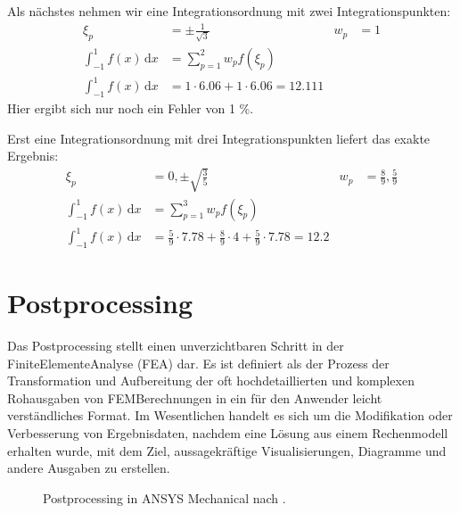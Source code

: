 \documentclass[letterpaper,10pt,german]{jupyterBook}
\let\sphinxpxdimen\pdfpxdimen\else\newdimen\sphinxpxdimen
\begin{document}
\sphinxAtStartPar
Als nächstes nehmen wir eine Integrationsordnung mit zwei Integrationspunkten:
\begin{align*}
\xi_p &= \pm \frac{1}{\sqrt{3}} & w_p &= 1 \\
\int_{-1}^{1} f(x) \, \mathrm{d}x &= \sum_{p=1}^{2} w_p f(\xi_p)  \\
\int_{-1}^{1} f(x) \, \mathrm{d}x &= 1 \cdot 6.06  + 1 \cdot 6.06 = 12.111
\end{align*}
\sphinxAtStartPar
Hier ergibt sich nur noch ein Fehler von 1 \%.

\sphinxAtStartPar
Erst eine Integrationsordnung mit drei Integrationspunkten liefert das exakte Ergebnis:
\begin{align*}
\xi_p &= 0, \pm \sqrt{\frac{3}{5}} & w_p &= \frac{8}{9}, \frac{5}{9} \\
\int_{-1}^{1} f(x) \, \mathrm{d}x &= \sum_{p=1}^{3} w_p f(\xi_p) \\
\int_{-1}^{1} f(x) \, \mathrm{d}x &= \frac{5}{9} \cdot 7.78  + \frac{8}{9} \cdot 4 + \frac{5}{9} \cdot 7.78  = 12.2
\end{align*}
\sphinxstepscope


\section{Postprocessing}
\label{\detokenize{chapters/chapter3/Postprocessing:postprocessing}}\label{\detokenize{chapters/chapter3/Postprocessing::doc}}
\sphinxAtStartPar
Das Postprocessing stellt einen unverzichtbaren Schritt in der Finite\sphinxhyphen{}Elemente\sphinxhyphen{}Analyse (FEA) dar. Es ist definiert als der Prozess der Transformation und Aufbereitung der oft hochdetaillierten und komplexen Rohausgaben von FEM\sphinxhyphen{}Berechnungen in ein für den Anwender leicht verständliches Format. Im Wesentlichen handelt es sich um die Modifikation oder Verbesserung von Ergebnisdaten, nachdem eine Lösung aus einem Rechenmodell erhalten wurde, mit dem Ziel, aussagekräftige Visualisierungen, Diagramme und andere Ausgaben zu erstellen.

\begin{figure}[htbp]
\centering
\capstart

\noindent\sphinxincludegraphics[width=500\sphinxpxdimen]{{postproc_ansys}.png}
\caption{Postprocessing in ANSYS Mechanical nach .}\label{\detokenize{chapters/chapter3/Postprocessing:postprocansys}}\end{figure}
\end{document}
